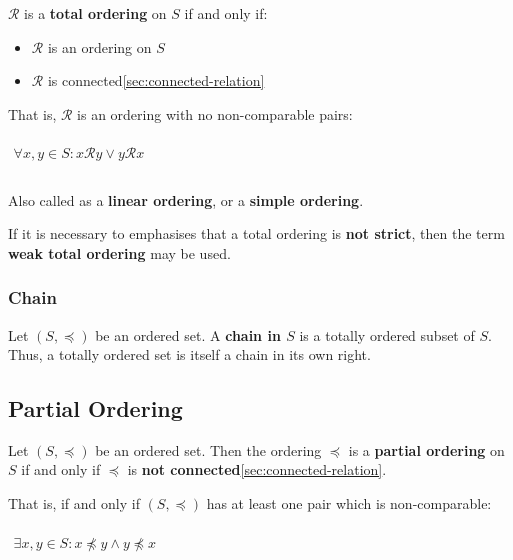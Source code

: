 $\mathcal{R}$ is a \textbf{total ordering} on $S$ if and only if:

\begin{itemize}
\item $\mathcal{R}$ is an ordering on $S$
\item $\mathcal{R}$ is connected\ref{sec:connected-relation}
\end{itemize}

That is, $\mathcal{R}$ is an ordering with no non-comparable pairs:


\begin{math}
  \begin{array}{c}
    \\
    \forall x, y \in S: x \mathcal{R} y \lor y \mathcal{R} x\\
    \\
  \end{array}
\end{math}

Also called as a \textbf{linear ordering}, or a \textbf{simple
  ordering}.

If it is necessary to emphasises that a total ordering is \textbf{not
  strict}, then the term \textbf{weak total ordering} may be used.

\subsubsection{Chain}
\label{sec:chain}

Let $(S, \preceq)$ be an ordered set. A \textbf{chain in $S$} is a
totally ordered subset of $S$. Thus, a totally ordered set is itself a
chain in its own right.


\subsection{Partial Ordering}
\label{sec:partial-ordering}

Let $(S, \preceq)$ be an ordered set. Then the ordering $\preceq$ is a
\textbf{partial ordering} on $S$ if and only if $\preceq$ is
\textbf{not connected}\ref{sec:connected-relation}.

That is, if and only if $(S, \preceq)$ has at least one pair which is
non-comparable:

\begin{math}
  \begin{array}{c}
    \\
    \exists x, y \in S : x \npreceq y \land y \npreceq x \\
    \\
  \end{array}
\end{math}


